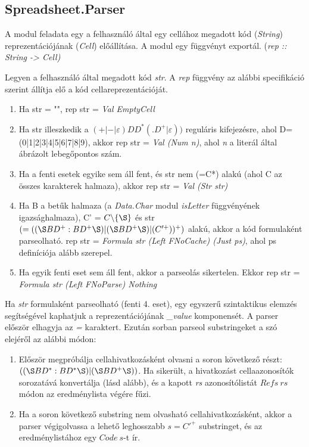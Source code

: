 \subsection{Spreadsheet.Parser}

A modul feladata egy a felhasználó által egy cellához megadott kód (\textit{String}) reprezentációjának (\textit{Cell}) előállítása. A modul egy függvényt exportál. (\textit{rep :: String -> Cell)}

Legyen a felhasználó által megadott kód \textit{str}. A \textit{rep} függvény az alábbi specifikáció szerint állítja elő a kód cellareprezentációját.

\begin{enumerate}
	\item Ha str = "", rep str = \textit{Val EmptyCell}
	\item Ha str illeszkedik a $(+|-|\varepsilon)DD^*(.D^+|\varepsilon))$ reguláris kifejezésre, ahol D=(0|1|2|3|4|5|6|7|8|9), akkor rep str = \textit{Val (Num n)}, ahol \textit{n} a literál által ábrázolt lebegőpontos szám. 
	\item Ha a fenti esetek egyike sem áll fent, és str nem (=C*) alakú (ahol C az összes karakterek halmaza), akkor rep str = \textit{Val (Str str)}
	\item Ha B a betűk halmaza (a \textit{Data.Char} modul \textit{isLetter} függvényének igazsághalmaza), C' = $C \backslash \{\S\}$ és str $(=((\S  BD^+:BD^+\S )|(\S BD^+\S )|(C'^+))^+)$ alakú, akkor a kód formulaként parseolható. rep str = \textit{Formula str (Left FNoCache) (Just ps)}, ahol ps definíciója alább szerepel.
	\item Ha egyik fenti eset sem áll fent, akkor a parseolás sikertelen. Ekkor rep str = \textit{Formula str (Left FNoParse) Nothing}
\end{enumerate}

Ha \textit{str} formulaként parseolható (fenti 4. eset), egy egyszerű szintaktikus elemzés segítségével kaphatjuk a reprezentációjának \textit{\_value} komponensét. A parser először elhagyja az \textit{=} karaktert. Ezután sorban parseol substringeket a szó elejéről az alábbi módon:
\begin{enumerate}
	\item Először megpróbálja cellahivatkozásként olvasni a soron következő részt: $((\S  BD^*:BD^*\S )|(\S BD^+\S ))$. Ha sikerült, a hivatkozást cellaazonosítók sorozatává konvertálja (lásd alább), és a kapott \textit{rs} azonosítólistát $Refs\ rs$ módon az eredménylista végére fűzi.
	\item Ha a soron következő substring nem olvasható cellahivatkozásként, akkor a parser végigolvassa a lehető leghosszabb $s = C'^+$ substringet, és az eredménylistához egy $Code\ s$-t ír.
\end{enumerate}

